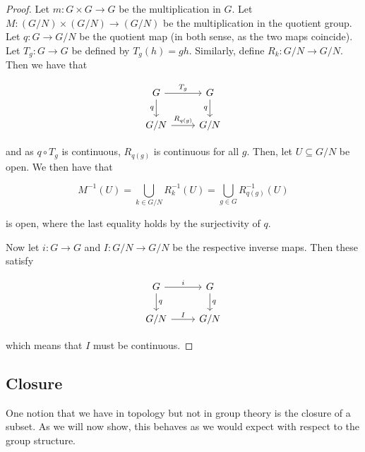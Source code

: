 \documentclass{article}
\begin{document}
    \begin{proof}
        Let $m : G \times G \to G$ be the multiplication in $G$. Let $M : (G/N) \times (G/N) \to (G/N)$ be the multiplication in the quotient group. Let $q : G \to G/N$ be the quotient map (in both sense, as the two maps coincide). Let $T_g : G \to G$ be defined by $T_g(h) = gh$. Similarly, define $R_k : G/N \to G/N$. Then we have that

        \[\begin{tikzcd}
            G & G \\
            {G/N} & {G/N}
            \arrow["{T_g}", from=1-1, to=1-2]
            \arrow["{R_{q(g)}}", from=2-1, to=2-2]
            \arrow["q"', from=1-1, to=2-1]
            \arrow["q"', from=1-2, to=2-2]
        \end{tikzcd}\]

        and as $q \circ T_g$ is continuous, $R_{q(g)}$ is continuous for all $g$. Then, let $U \subseteq G/N$ be open. We then have that

        $$M^{-1}(U) = \bigcup_{k \in G/N}R_k^{-1}(U) = \bigcup_{g \in G} R_{q(g)}^{-1}(U)$$

        is open, where the last equality holds by the surjectivity of $q$. 
        
        Now let $i : G \to G$ and $I : G/N \to G/N$ be the respective inverse maps. Then these satisfy

        \[\begin{tikzcd}
            G & G \\
            {G/N} & {G/N}
            \arrow["q", from=1-2, to=2-2]
            \arrow["q", from=1-1, to=2-1]
            \arrow["i", from=1-1, to=1-2]
            \arrow["I", from=2-1, to=2-2]
        \end{tikzcd}\]

        which means that $I$ must be continuous.
    \end{proof}

    \subsection{Closure}

    One notion that we have in topology but not in group theory is the closure of a subset. As we will now show, this behaves as we would expect with respect to the group structure.
\end{document}
